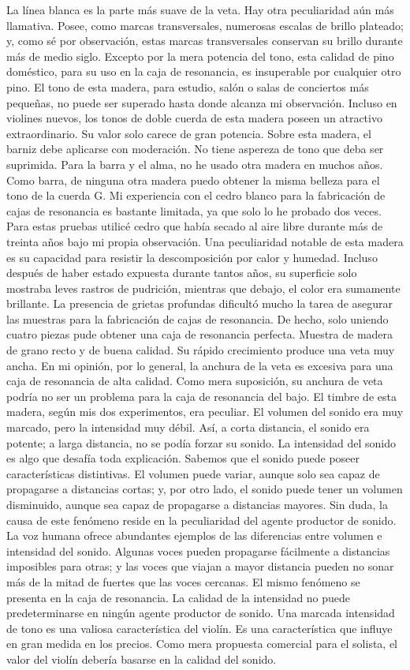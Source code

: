 La línea blanca es la parte más suave de la veta. Hay otra peculiaridad aún más llamativa. Posee, como marcas transversales, numerosas escalas de brillo plateado; y, como sé por observación, estas marcas transversales conservan su brillo durante más de medio siglo. Excepto por la mera potencia del tono, esta calidad de pino doméstico, para su uso en la caja de resonancia, es insuperable por cualquier otro pino. El tono de esta madera, para estudio, salón o salas de conciertos más pequeñas, no puede ser superado hasta donde alcanza mi observación. Incluso en violines nuevos, los tonos de doble cuerda de esta madera poseen un atractivo extraordinario. Su valor solo carece de gran potencia. Sobre esta madera, el barniz debe aplicarse con moderación. No tiene aspereza de tono que deba ser suprimida. Para la barra y el alma, no he usado otra madera en muchos años. Como barra, de ninguna otra madera puedo obtener la misma belleza para el tono de la cuerda G.
Mi experiencia con el cedro blanco para la fabricación de cajas de resonancia es bastante limitada, ya que solo lo he probado dos veces. Para estas pruebas utilicé cedro que había secado al aire libre durante más de treinta años bajo mi propia observación. Una peculiaridad notable de esta madera es su capacidad para resistir la descomposición por calor y humedad. Incluso después de haber estado expuesta durante tantos años, su superficie solo mostraba leves rastros de pudrición, mientras que debajo, el color era sumamente brillante. La presencia de grietas profundas dificultó mucho la tarea de asegurar las muestras para la fabricación de cajas de resonancia. De hecho, solo uniendo cuatro piezas pude obtener una caja de resonancia perfecta.
Muestra de madera de grano recto y de buena calidad. Su rápido crecimiento produce una veta muy ancha. En mi opinión, por lo general, la anchura de la veta es excesiva para una caja de resonancia de alta calidad. Como mera suposición, su anchura de veta podría no ser un problema para la caja de resonancia del bajo. El timbre de esta madera, según mis dos experimentos, era peculiar. El volumen del sonido era muy marcado, pero la intensidad muy débil. Así, a corta distancia, el sonido era potente; a larga distancia, no se podía forzar su sonido.
La intensidad del sonido es algo que desafía toda explicación. Sabemos que el sonido puede poseer características distintivas.
El volumen puede variar, aunque solo sea capaz de propagarse a distancias cortas; y, por otro lado, el sonido puede tener un volumen disminuido, aunque sea capaz de propagarse a distancias mayores. Sin duda, la causa de este fenómeno reside en la peculiaridad del agente productor de sonido. La voz humana ofrece abundantes ejemplos de las diferencias entre volumen e intensidad del sonido. Algunas voces pueden propagarse fácilmente a distancias imposibles para otras; y las voces que viajan a mayor distancia pueden no sonar más de la mitad de fuertes que las voces cercanas. El mismo fenómeno se presenta en la caja de resonancia. La calidad de la intensidad no puede predeterminarse en ningún agente productor de sonido. Una marcada intensidad de tono es una valiosa característica del violín. Es una característica que influye en gran medida en los precios. Como mera propuesta comercial para el solista, el valor del violín debería basarse en la calidad del sonido.
